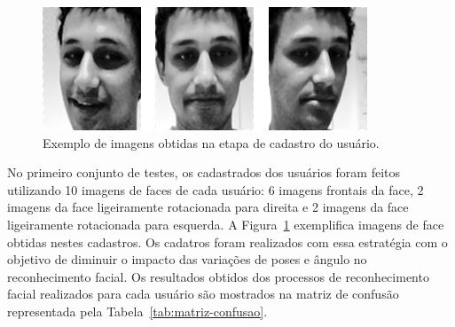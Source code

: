 
		\begin{figure}[htb]
			\begin{center}
				\includegraphics[scale=0.4]{figuras/4.ProblemaEProposta/face-registro.png}
			\end{center}
			\caption{Exemplo de imagens obtidas na etapa de cadastro do usuário.}
			\label{fig:imgs-cadastro}
		\end{figure}	

	No primeiro conjunto de testes, os cadastrados dos usuários foram feitos utilizando 10 imagens de faces de cada usuário: 6 imagens frontais da face, 2 imagens da face ligeiramente rotacionada para direita e 2 imagens da face ligeiramente rotacionada para esquerda. A Figura~\ref{fig:imgs-cadastro} exemplifica imagens de face obtidas nestes cadastros. Os cadatros foram realizados com essa estratégia com o objetivo de diminuir o impacto das variações de poses e ângulo no reconhecimento facial. Os resultados obtidos dos processos de reconhecimento facial realizados para cada usuário são mostrados na matriz de confusão representada pela Tabela~\ref{tab:matriz-confusao}. 

